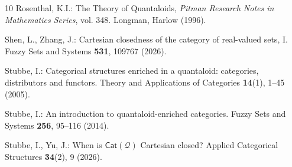 \documentclass{birkau}
\theoremstyle{plain}
\theoremstyle{definition}
\numberwithin{equation}{section}
\begin{document}
\begin{thebibliography}{10}
Rosenthal, K.I.: The Theory of Quantaloids, \emph{Pitman Research Notes in
  Mathematics Series}, vol. 348.
\newblock Longman, Harlow (1996).

Shen, L., Zhang, J.: Cartesian closedness of the category of real-valued sets,
  {I}.
\newblock Fuzzy Sets and Systems \textbf{531}, 109767 (2026).

Stubbe, I.: Categorical structures enriched in a quantaloid: categories,
  distributors and functors.
\newblock Theory and Applications of Categories \textbf{14}(1), 1--45 (2005).

Stubbe, I.: An introduction to quantaloid-enriched categories.
\newblock Fuzzy Sets and Systems \textbf{256}, 95--116 (2014).

Stubbe, I., Yu, J.: When is $\textsf{Cat}(\mathcal Q)$ Cartesian closed?
\newblock Applied Categorical Structures \textbf{34}(2), 9 (2026).

\end{thebibliography}
\end{document}
